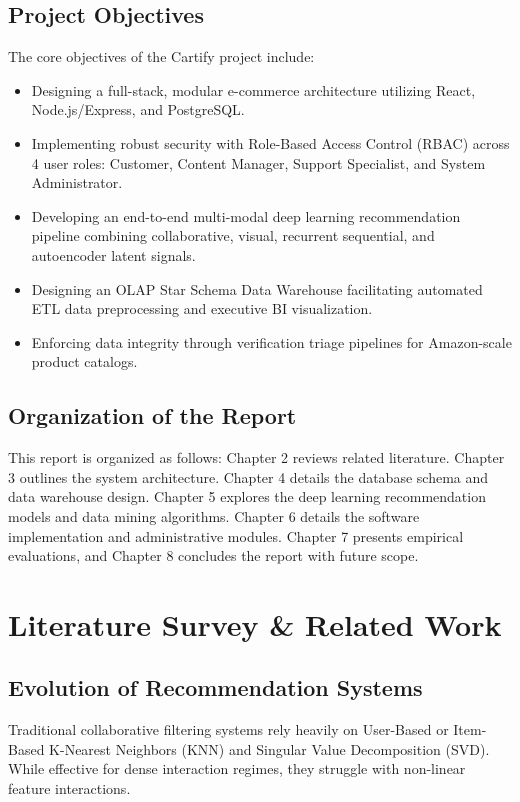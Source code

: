 \documentclass[12pt,a4paper,oneside]{report}
\begin{document}
\section{Project Objectives}
The core objectives of the Cartify project include:
\begin{itemize}
    \item Designing a full-stack, modular e-commerce architecture utilizing React, Node.js/Express, and PostgreSQL.
    \item Implementing robust security with Role-Based Access Control (RBAC) across 4 user roles: Customer, Content Manager, Support Specialist, and System Administrator.
    \item Developing an end-to-end multi-modal deep learning recommendation pipeline combining collaborative, visual, recurrent sequential, and autoencoder latent signals.
    \item Designing an OLAP Star Schema Data Warehouse facilitating automated ETL data preprocessing and executive BI visualization.
    \item Enforcing data integrity through verification triage pipelines for Amazon-scale product catalogs.
\end{itemize}

\section{Organization of the Report}
This report is organized as follows: Chapter 2 reviews related literature. Chapter 3 outlines the system architecture. Chapter 4 details the database schema and data warehouse design. Chapter 5 explores the deep learning recommendation models and data mining algorithms. Chapter 6 details the software implementation and administrative modules. Chapter 7 presents empirical evaluations, and Chapter 8 concludes the report with future scope.

\chapter{Literature Survey \& Related Work}

\section{Evolution of Recommendation Systems}
Traditional collaborative filtering systems rely heavily on User-Based or Item-Based K-Nearest Neighbors (KNN) and Singular Value Decomposition (SVD). While effective for dense interaction regimes, they struggle with non-linear feature interactions.
\end{document}
